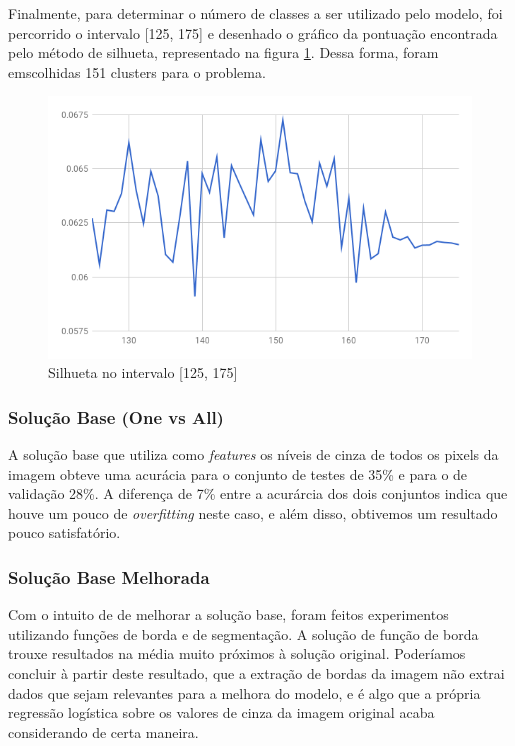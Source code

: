 \documentclass[conference]{IEEEtran}
\begin{document}
Finalmente, para determinar o número de classes a ser utilizado pelo modelo, foi percorrido o intervalo [125, 175] e desenhado o gráfico da pontuação encontrada pelo método de silhueta, representado na figura \ref{fig:sil2}. Dessa forma, foram emscolhidas 151 clusters para o problema. 

\begin{figure}[H]
  \includegraphics[scale=0.4, center]{silhouette2.png}
  \caption{Silhueta no intervalo [125, 175]}
  \label{fig:sil2}
\end{figure}


\subsubsection{Solução Base (One vs All)}
A solução base que utiliza como \textit{features} os níveis de cinza de todos os pixels da imagem obteve uma acurácia para o conjunto de testes de 35\% e para o de validação 28\%. A diferença de 7\% entre a acurárcia dos dois conjuntos indica que houve um pouco de \textit{overfitting} neste caso, e além disso, obtivemos um resultado pouco satisfatório.

\subsubsection{Solução Base Melhorada}
Com o intuito de de melhorar a solução base, foram feitos experimentos utilizando funções de borda e de segmentação. A solução de função de borda trouxe resultados na média muito próximos à solução original. Poderíamos concluir à partir deste resultado, que a extração de bordas da imagem não extrai dados que sejam relevantes para a melhora do modelo, e é algo que a própria regressão logística sobre os valores de cinza da imagem original acaba considerando de certa maneira.
\end{document}

